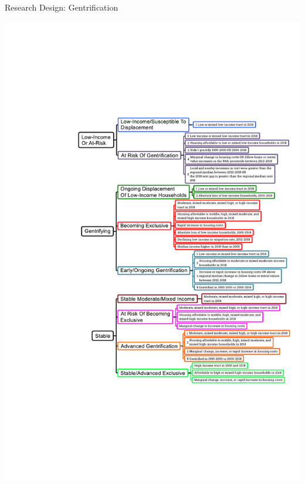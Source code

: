 \documentclass{beamer}
\begin{document}
\begin{frame}{Research Design: Gentrification}
\begin{center}
\includegraphics[scale=1]{images/gentrifying}
\end{center}
\end{frame}
\end{document}
